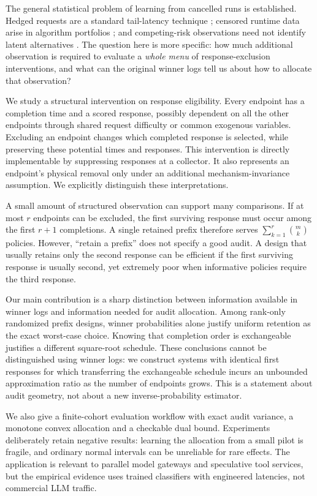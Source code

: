 \documentclass[12pt]{clear2027}
\begin{document}
The general statistical problem of learning from cancelled runs is established. Hedged requests are a standard tail-latency technique \citep{dean2013}; censored runtime data arise in algorithm portfolios \citep{gagliolo2007,hutter2014}; and competing-risk observations need not identify latent alternatives \citep{tsiatis1975}. The question here is more specific: how much additional observation is required to evaluate a \emph{whole menu} of response-exclusion interventions, and what can the original winner logs tell us about how to allocate that observation?

We study a structural intervention on response eligibility. Every endpoint has a completion time and a scored response, possibly dependent on all the other endpoints through shared request difficulty or common exogenous variables. Excluding an endpoint changes which completed response is selected, while preserving these potential times and responses. This intervention is directly implementable by suppressing responses at a collector. It also represents an endpoint's physical removal only under an additional mechanism-invariance assumption. We explicitly distinguish these interpretations.

A small amount of structured observation can support many comparisons. If at most $r$ endpoints can be excluded, the first surviving response must occur among the first $r+1$ completions. A single retained prefix therefore serves $\sum_{k=1}^r\binom{m}{k}$ policies. However, ``retain a prefix'' does not specify a good audit. A design that usually retains only the second response can be efficient if the first surviving response is usually second, yet extremely poor when informative policies require the third response.

Our main contribution is a sharp distinction between information available in winner logs and information needed for audit allocation. Among rank-only randomized prefix designs, winner probabilities alone justify uniform retention as the exact worst-case choice. Knowing that completion order is exchangeable justifies a different square-root schedule. These conclusions cannot be distinguished using winner logs: we construct systems with identical first responses for which transferring the exchangeable schedule incurs an unbounded approximation ratio as the number of endpoints grows. This is a statement about audit geometry, not about a new inverse-probability estimator.

We also give a finite-cohort evaluation workflow with exact audit variance, a monotone convex allocation and a checkable dual bound. Experiments deliberately retain negative results: learning the allocation from a small pilot is fragile, and ordinary normal intervals can be unreliable for rare effects. The application is relevant to parallel model gateways and speculative tool services, but the empirical evidence uses trained classifiers with engineered latencies, not commercial LLM traffic.
\end{document}
